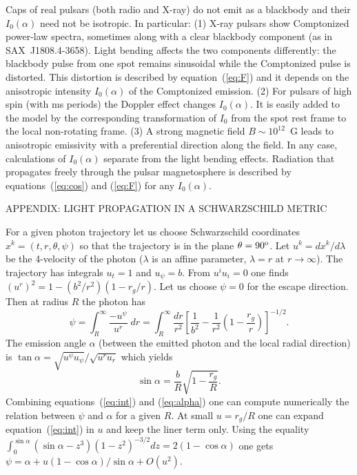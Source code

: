 \documentclass{article}
\def\dd{{ d}}
\def\dg{{\rm o}}
\begin{document}
Caps of real pulsars (both radio and X-ray) do not emit as a blackbody
and their $I_0(\alpha)$ need not be isotropic. In particular: 
(1) X-ray pulsars show Comptonized power-law spectra, sometimes along with a 
clear blackbody component (as in SAX~J1808.4-3658). 
Light bending affects the two components differently: the blackbody pulse
from one spot remains sinusoidal while the Comptonized pulse is distorted. 
This distortion is described by equation~(\ref{eq:F}) and it depends on 
the anisotropic intensity $I_0(\alpha)$ of the Comptonized emission.
(2) For pulsars of high spin (with ms periods) the Doppler effect changes 
$I_0(\alpha)$. It is easily added to the model by the corresponding 
transformation of $I_0$ from the spot rest frame to the local non-rotating 
frame. (3) A strong magnetic field $B\sim 10^{12}$~G leads to anisotropic 
emissivity with a preferential direction along the field.
In any case, calculations of $I_0(\alpha)$ separate from the light bending 
effects. Radiation that propagates freely through the pulsar magnetosphere 
is described by equations~(\ref{eq:cos}) and (\ref{eq:F}) for any $I_0(\alpha)$.




\begin{center}
  APPENDIX: LIGHT PROPAGATION IN A SCHWARZSCHILD METRIC
\end{center}


For a given photon trajectory let us choose Schwarzschild coordinates 
$x^k=(t,r,\theta,\psi)$ so that the trajectory is in the plane $\theta=90^\dg$. 
Let $u^k=\dd x^k/\dd\lambda$ be the 4-velocity of the photon ($\lambda$ is 
an affine parameter, $\lambda=r$ at $r\rightarrow\infty$). The trajectory has 
integrals $u_t=1$ and $u_\psi=b$. 
From $u^iu_i=0$ one finds $(u^r)^2=1-(b^2/r^2)(1-r_g/r)$. Let us choose
$\psi=0$ for the escape direction. Then at radius $R$ the photon has
\begin{equation}
\label{eq:int}
   \psi=\int_R^\infty\frac{-u^\psi}{u^r}\;\dd r
       =\int_R^\infty\frac{\dd r}{r^2}\left[\frac{1}{b^2}-\frac{1}{r^2}
        \left(1-\frac{r_g}{r}\right)\right]^{-1/2}.
\end{equation}
The emission angle $\alpha$ (between the emitted photon and the local 
radial direction) is $\tan\alpha=\sqrt{u^\psi u_\psi}/\sqrt{u^ru_r}$ which 
yields
\begin{equation}
\label{eq:alpha}
   \sin\alpha=\frac{b}{R}\sqrt{1-\frac{r_g}{R}}.
\end{equation}
Combining equations~(\ref{eq:int}) and (\ref{eq:alpha}) one can compute
numerically the relation between $\psi$ and $\alpha$ for a given $R$. 
At small $u=r_g/R$ one can expand equation~(\ref{eq:int}) in $u$ and 
keep the liner term only. Using the equality 
$\int_0^{\sin\alpha}(\sin\alpha-z^3)(1-z^2)^{-3/2}\dd z=2(1-\cos\alpha)$
one gets $\psi=\alpha+u(1-\cos\alpha)/\sin\alpha+O(u^2)$.
\end{document}

